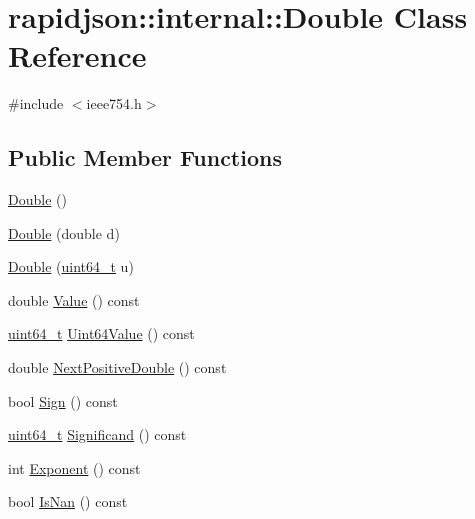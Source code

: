 \hypertarget{classrapidjson_1_1internal_1_1_double}{}\section{rapidjson\+::internal\+::Double Class Reference}
\label{classrapidjson_1_1internal_1_1_double}


{\ttfamily \#include $<$ieee754.\+h$>$}

\subsection*{Public Member Functions}
\begin{DoxyCompactItemize}
\item 
\mbox{\hyperlink{classrapidjson_1_1internal_1_1_double_a6a806fb33921f079eac494f82aa041f7}{Double}} ()
\item 
\mbox{\hyperlink{classrapidjson_1_1internal_1_1_double_a7b18d4e93fd0bae8fcbc1fedf95c4edb}{Double}} (double d)
\item 
\mbox{\hyperlink{classrapidjson_1_1internal_1_1_double_a8697b34333785e2b314f1ae09871652d}{Double}} (\mbox{\hyperlink{stdint_8h_aec6fcb673ff035718c238c8c9d544c47}{uint64\+\_\+t}} u)
\item 
double \mbox{\hyperlink{classrapidjson_1_1internal_1_1_double_ab2f141d811565e1a4a3c4d3ec6390981}{Value}} () const
\item 
\mbox{\hyperlink{stdint_8h_aec6fcb673ff035718c238c8c9d544c47}{uint64\+\_\+t}} \mbox{\hyperlink{classrapidjson_1_1internal_1_1_double_af193524f8f31ea11dca828e3df192e74}{Uint64\+Value}} () const
\item 
double \mbox{\hyperlink{classrapidjson_1_1internal_1_1_double_a21819f1a5166c96c8c2fcfd924499d53}{Next\+Positive\+Double}} () const
\item 
bool \mbox{\hyperlink{classrapidjson_1_1internal_1_1_double_a48bc9da5e0a79c25f107faefd3607125}{Sign}} () const
\item 
\mbox{\hyperlink{stdint_8h_aec6fcb673ff035718c238c8c9d544c47}{uint64\+\_\+t}} \mbox{\hyperlink{classrapidjson_1_1internal_1_1_double_acab4a6239a646ca3f6da460ddca20ea1}{Significand}} () const
\item 
int \mbox{\hyperlink{classrapidjson_1_1internal_1_1_double_a7fc1b2b1a48d30b61636b12c47c928f4}{Exponent}} () const
\item 
bool \mbox{\hyperlink{classrapidjson_1_1internal_1_1_double_af8d174992b769af3631b926caafb5ebd}{Is\+Nan}} () const

\end{DoxyCompactItemize}
